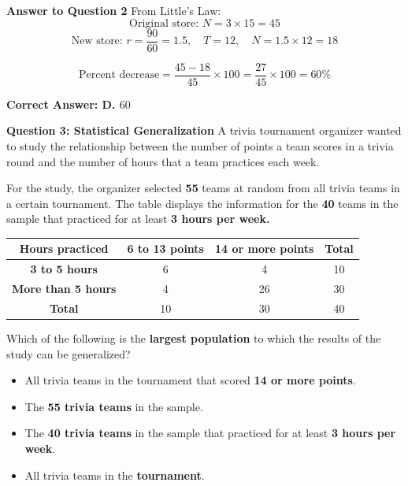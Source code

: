 \documentclass{beamer}
\begin{document}
\begin{frame}{\textbf{Answer to Question 2}}
From Little's Law:
\[
\text{Original store: } N = 3 \times 15 = 45
\]
\[
\text{New store: } r = \frac{90}{60} = 1.5,\quad T = 12,\quad N = 1.5 \times 12 = 18
\]

\[
\text{Percent decrease} = \frac{45 - 18}{45} \times 100 = \frac{27}{45} \times 100 = 60\%
\]

\textbf{Correct Answer: D. \( 60 \)}
\end{frame}

\begin{frame}{\textbf{Question 3: Statistical Generalization}}
\small
A trivia tournament organizer wanted to study the relationship between the number of points a team scores in a trivia round and the number of hours that a team practices each week.

For the study, the organizer selected \textbf{55} teams at random from all trivia teams in a certain tournament. The table displays the information for the \textbf{40} teams in the sample that practiced for at least \textbf{3 hours per week.}

\begin{center}
\begin{tabular}{|c|c|c|c|}
\hline
\textbf{Hours practiced} & \textbf{6 to 13 points} & \textbf{14 or more points} & \textbf{Total} \\
\hline
\textbf{3 to 5 hours} & 6 & 4 & 10 \\
\textbf{More than 5 hours} & 4 & 26 & 30 \\
\hline
\textbf{Total} & 10 & 30 & 40 \\
\hline
\end{tabular}
\end{center}

Which of the following is the \textbf{largest population} to which the results of the study can be generalized?

\begin{itemize}
    \item[A.] All trivia teams in the tournament that scored \textbf{14 or more points}.
    \item[B.] The \textbf{55 trivia teams} in the sample.
    \item[C.] The \textbf{40 trivia teams} in the sample that practiced for at least \textbf{3 hours per week}.
    \item[D.] All trivia teams in the \textbf{tournament}.
\end{itemize}
\end{frame}
\end{document}
